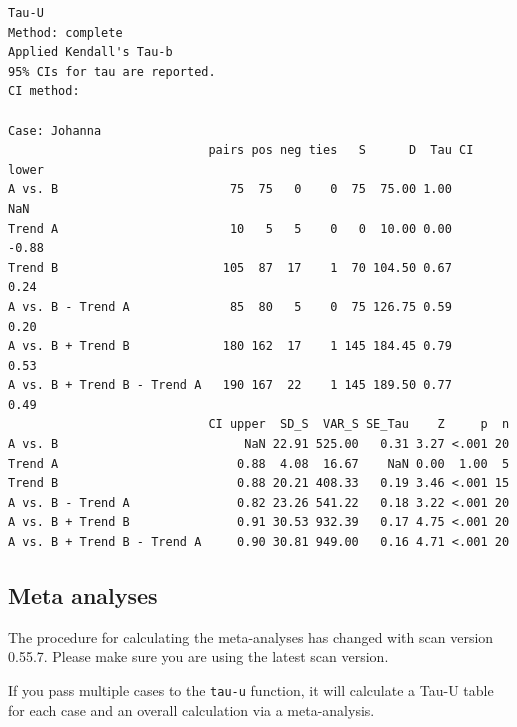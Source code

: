\documentclass[
  letterpaper,
  DIV=11,
  numbers=noendperiod]{scrreprt}
\begin{document}
\begin{verbatim}
Tau-U
Method: complete 
Applied Kendall's Tau-b
95% CIs for tau are reported.
CI method: 

Case: Johanna 
                            pairs pos neg ties   S      D  Tau CI lower
A vs. B                        75  75   0    0  75  75.00 1.00      NaN
Trend A                        10   5   5    0   0  10.00 0.00    -0.88
Trend B                       105  87  17    1  70 104.50 0.67     0.24
A vs. B - Trend A              85  80   5    0  75 126.75 0.59     0.20
A vs. B + Trend B             180 162  17    1 145 184.45 0.79     0.53
A vs. B + Trend B - Trend A   190 167  22    1 145 189.50 0.77     0.49
                            CI upper  SD_S  VAR_S SE_Tau    Z     p  n
A vs. B                          NaN 22.91 525.00   0.31 3.27 <.001 20
Trend A                         0.88  4.08  16.67    NaN 0.00  1.00  5
Trend B                         0.88 20.21 408.33   0.19 3.46 <.001 15
A vs. B - Trend A               0.82 23.26 541.22   0.18 3.22 <.001 20
A vs. B + Trend B               0.91 30.53 932.39   0.17 4.75 <.001 20
A vs. B + Trend B - Trend A     0.90 30.81 949.00   0.16 4.71 <.001 20
\end{verbatim}

\hypertarget{meta-analyses}{%
\subsection{Meta analyses}\label{meta-analyses}}

\begin{tcolorbox}[enhanced jigsaw, breakable, toptitle=1mm, colframe=quarto-callout-note-color-frame, arc=.35mm, titlerule=0mm, coltitle=black, rightrule=.15mm, bottomtitle=1mm, bottomrule=.15mm, colbacktitle=quarto-callout-note-color!10!white, title=\textcolor{quarto-callout-note-color}{\faInfo}\hspace{0.5em}{Note}, colback=white, opacitybacktitle=0.6, opacityback=0, leftrule=.75mm, toprule=.15mm, left=2mm]

The procedure for calculating the meta-analyses has changed with scan
version 0.55.7. Please make sure you are using the latest scan version.

\end{tcolorbox}

If you pass multiple cases to the \texttt{tau-u} function, it will
calculate a Tau-U table for each case and an overall calculation via a
meta-analysis.
\end{document}

